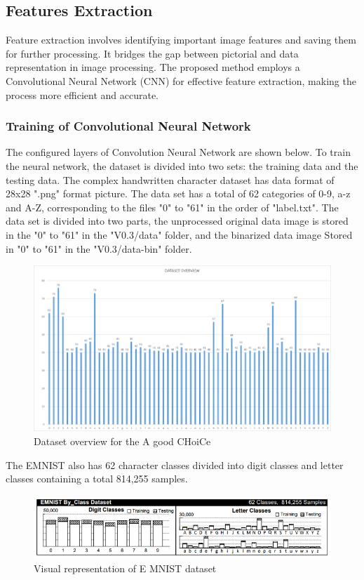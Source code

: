 \subsection{Features Extraction}
Feature extraction involves identifying important image features and saving them for further processing. It bridges the gap between pictorial and data representation in image processing. The proposed method employs a Convolutional Neural Network (CNN) for effective feature extraction, making the process more efficient and accurate.
\subsubsection{Training of Convolutional Neural Network}
The configured layers of Convolution Neural Network are shown below. To train the neural network, the dataset is divided into two sets: the training data and the testing data. The complex handwritten character dataset has data format of 28x28 ".png" format picture. The data set has a total of 62 categories of 0-9, a-z and A-Z, corresponding to the files "0" to "61" in the order of "label.txt". The data set is divided into two parts, the unprocessed original data image is stored in the "0" to "61" in the "V0.3/data" folder, and the binarized data image Stored in "0" to "61" in the "V0.3/data-bin" folder\cite{Ishfar2020DocumentDetection}.
\begin{figure}[h]
    \centering
        \includegraphics[scale=0.45]{images/Data_overview.png}
        \caption{Dataset overview for the A good CHoiCe}%
    \end{figure}
    The EMNIST also has 62 character classes divided into digit classes and letter classes containing a total 814,255 samples\cite{Ishfar2020DocumentDetection}.
    \begin{figure}[h]

        \centering
            \includegraphics[scale=0.45]{images/EMNIST_Dataset.png}
            \caption{Visual representation of E MNIST dataset}%
        \end{figure}  

